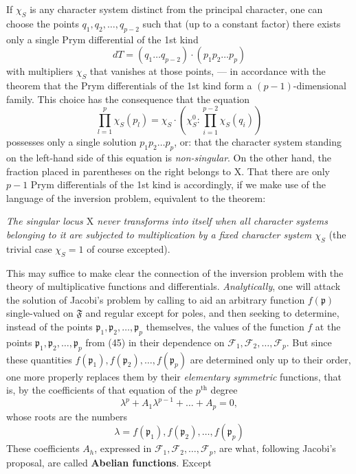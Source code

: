 \documentclass{article}
\begin{document}
If $\chi_S$ is any character system distinct from the principal character, one can choose the points $q_1, q_2, \dots, q_{p-2}$ such that (up to a constant factor) there exists only a single Prym differential of the 1st kind
\[ dT = (q_1 \dots q_{p-2}) \cdot (p_1 p_2 \dots p_p) \]
with multipliers $\chi_S$ that vanishes at those points, --- in accordance with the theorem that the Prym differentials of the 1st kind form a $(p - 1)$-dimensional family. This choice has the consequence that the equation
\[ \prod_{l=1}^p \chi_S(p_l) = \chi_S \cdot \left( \chi_S^0 : \prod_{i=1}^{p-2} \chi_S(q_i) \right) \]
possesses only a single solution $p_1 p_2 \dots p_p$, or: that the character system standing on the left-hand side of this equation is \emph{non-singular}. On the other hand, the fraction placed in parentheses on the right belongs to $\mathrm{X}$. That there are only $p - 1$ Prym differentials of the 1st kind is accordingly, if we make use of the language of the inversion problem, equivalent to the theorem:

\emph{The singular locus $\mathrm{X}$ never transforms into itself when all character systems belonging to it are subjected to multiplication by a fixed character system $\chi_S$} (the trivial case $\chi_S = 1$ of course excepted).

This may suffice to make clear the connection of the inversion problem with the theory of multiplicative functions and differentials. \emph{Analytically}, one will attack the solution of Jacobi's problem by calling to aid an arbitrary function $f(\mathfrak{p})$ single-valued on $\mathfrak{F}$ and regular except for poles, and then seeking to determine, instead of the points $\mathfrak{p}_1, \mathfrak{p}_2, \dots, \mathfrak{p}_p$ themselves, the values of the function $f$ at the points $\mathfrak{p}_1, \mathfrak{p}_2, \dots, \mathfrak{p}_p$ from (45) in their dependence on $\mathcal{F}_1, \mathcal{F}_2, \dots, \mathcal{F}_p$. But since these quantities $f(\mathfrak{p}_1), f(\mathfrak{p}_2), \dots, f(\mathfrak{p}_p)$ are determined only up to their order, one more properly replaces them by their \emph{elementary symmetric} functions, that is, by the coefficients of that equation of the $p^{\text{th}}$ degree
\[ \lambda^p + A_1 \lambda^{p-1} + \dots + A_p = 0, \]
whose roots are the numbers
\[ \lambda = f(\mathfrak{p}_1), f(\mathfrak{p}_2), \dots, f(\mathfrak{p}_p) \]
These coefficients $A_h$, expressed in $\mathcal{F}_1, \mathcal{F}_2, \dots, \mathcal{F}_p$, are what, following Jacobi's proposal, are called \textbf{Abelian functions}. Except
\end{document}
